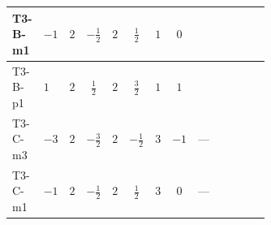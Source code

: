 \documentclass[8pt]{article}
\begin{document}
\begin{landscape}
\begin{longtable}{@{}llcccccc >{\raggedright\arraybackslash}p{0.21\linewidth} >{\raggedright\arraybackslash}p{0.21\linewidth} >{\raggedright\arraybackslash}p{0.21\linewidth}@{}}
\midrule
T3-B-m1 & $-1$ & $2$ & $-\frac{1}{2}$ & $2$ & $\frac{1}{2}$ & $1$ & $0$ & \scriptsize\adjustbox{max width=\linewidth}{$\begin{gathered} {\lambda_{HS_2}^{(1)}} (2 T_{\nu}^{(2)}+6 \operatorname{Tr}\!\left({Y_d}\,\left({Y_d}\right)^{\dagger}\right)+2 \operatorname{Tr}\!\left({Y_e}\,\left({Y_e}\right)^{\dagger}\right)+6 \operatorname{Tr}\!\left({Y_u}\,\left({Y_u}\right)^{\dagger}\right))\end{gathered}$} & \scriptsize\adjustbox{max width=\linewidth}{$\begin{gathered} +\frac{9 {g_2}^4}{4}\end{gathered}$} & \scriptsize\adjustbox{max width=\linewidth}{$\begin{gathered} -9 {g_2}^2 {\lambda_{HS_2}^{(1)}}\end{gathered}$} \\
\midrule
T3-B-p1 & $1$ & $2$ & $\frac{1}{2}$ & $2$ & $\frac{3}{2}$ & $1$ & $1$ & \scriptsize\adjustbox{max width=\linewidth}{$\begin{gathered} {\lambda_{HS_2}^{(1)}} (2 T_{\nu}^{(2)}+6 \operatorname{Tr}\!\left({Y_d}\,\left({Y_d}\right)^{\dagger}\right)+2 \operatorname{Tr}\!\left({Y_e}\,\left({Y_e}\right)^{\dagger}\right)+6 \operatorname{Tr}\!\left({Y_u}\,\left({Y_u}\right)^{\dagger}\right))\end{gathered}$} & \scriptsize\adjustbox{max width=\linewidth}{$\begin{gathered} +\frac{9 {g_2}^4}{4}\end{gathered}$} & \scriptsize\adjustbox{max width=\linewidth}{$\begin{gathered} -9 {g_2}^2 {\lambda_{HS_2}^{(1)}}\end{gathered}$} \\
\midrule
T3-C-m3 & $-3$ & $2$ & $-\frac{3}{2}$ & $2$ & $-\frac{1}{2}$ & $3$ & $-1$ & --- & \scriptsize\adjustbox{max width=\linewidth}{$\begin{gathered} +\frac{9 {g_2}^4}{4}\end{gathered}$} & \scriptsize\adjustbox{max width=\linewidth}{$\begin{gathered} -9 {g_2}^2 {\lambda_{HS_2}^{(1)}}\end{gathered}$} \\
\midrule
T3-C-m1 & $-1$ & $2$ & $-\frac{1}{2}$ & $2$ & $\frac{1}{2}$ & $3$ & $0$ & --- & \scriptsize\adjustbox{max width=\linewidth}{$\begin{gathered} +\frac{9 {g_2}^4}{4}\end{gathered}$} & \scriptsize\adjustbox{max width=\linewidth}{$\begin{gathered} -9 {g_2}^2 {\lambda_{HS_2}^{(1)}}\end{gathered}$} \\

\end{longtable}
\end{landscape}
\end{document}
